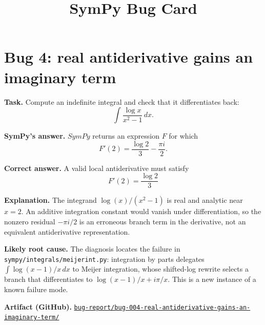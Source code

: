 \documentclass[11pt]{article}
\title{SymPy Bug Card}
\author{}
\date{}
\newcommand{\SymPy}{SymPy}
\newcommand{\artifactrepo}{https://github.com/TODO-org/TODO-repo}
\newcommand{\bugbundle}[1]{\href{\artifactrepo/tree/main/bug-report/#1}{\nolinkurl{bug-report/#1/}}}
\begin{document}
\maketitle

\section*{Bug 4: real antiderivative gains an imaginary term}

\begin{counterexamplebox}
\textbf{Task.} Compute an indefinite integral and check that it differentiates back:
\[
\int \frac{\log x}{x^2-1}\,dx.
\]

\medskip
\textbf{SymPy's answer.} \(\SymPy\) returns an expression \(F\) for which
\[
F'(2) = \frac{\log 2}{3}-\frac{\pi i}{2}.
\]

\medskip
\textbf{Correct answer.} A valid local antiderivative must satisfy 
\[
F'(2)= \frac{\log 2}{3}
\]

\medskip
\textbf{Explanation.} The integrand \(\log(x)/(x^2-1)\) is real and analytic near \(x=2\). An additive integration constant would vanish under differentiation, so the nonzero residual \(-\pi i/2\) is an erroneous branch term in the derivative, not an equivalent antiderivative representation.

\medskip
\textbf{Likely root cause.} The diagnosis locates the failure in \nolinkurl{sympy/integrals/meijerint.py}: integration by parts delegates \(\int \log(x-1)/x\,dx\) to Meijer integration, whose shifted-log rewrite selects a branch that differentiates to \(\log(x-1)/x+i\pi/x\). This is a new instance of a known failure mode.

\medskip
\textbf{Artifact (GitHub).} \bugbundle{bug-004-real-antiderivative-gains-an-imaginary-term}
\end{counterexamplebox}
\end{document}
